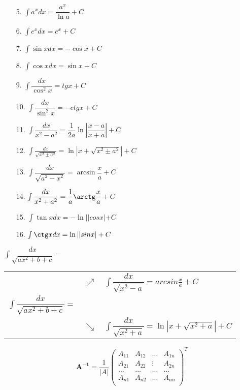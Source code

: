 \documentclass[12pt,4paper]{report}
\begin{document}
\begin{landscape}
\begin{multicols}{3}
\begin{itemize}
\item[5.] $\int a^x dx = \dfrac{a^x}{\ln a}+C $
\item[6.] $ \int e^x dx = e^x + C  $
\item[7.] $\int \sin x dx  = -\cos x + C $
\item[8.] $\int \cos x dx  = \sin x + C $
\item[9.] $ \int \dfrac{dx}{\cos^2x} = tgx + C $
\item[10.] $ \int \dfrac{dx}{\sin^2x} = -ctgx + C $
\item[11.] $\int \dfrac{dx}{x^2 - a^2} = \dfrac{1}{2a}\ln \left| \dfrac{x-a}{x+a} \right| + C\ $ 
\item[12.] $ \int \frac{dx}{\sqrt{x^2 \pm a^2}}=\ln|x+\sqrt{x^2 \pm a^2}| + C$
\item[13.] $\int \dfrac{dx}{\sqrt{a^2 - x^2}} = \arcsin \dfrac{x}{a} + C   $
\item[14.] $ \int \dfrac{dx}{x^2 + a^2} = \dfrac{1}{a} \arctg \dfrac{x}{a} + C$
\item[15.] $ \int \tan x dx  = -\ln||cosx| + C $ 
\item[16.] $ \int \ctg x dx  = \ln||sinx| + C $ 
\end{itemize}
\end{multicols}
 $ \int \dfrac{dx}{\sqrt{ax^2 + b + c}} = $
 \begin{flushright}
   \begin{tabular}{l l l} 
   &  {$\nearrow $} & {$ \int \dfrac{dx}{\sqrt{x^2-a}}=arcsin\frac{x}{a} + C $} \\
  $ \int \dfrac{dx}{\sqrt{ax^2 + b + c}} = $ &  &  \\ 
       & $\searrow $ & $ \int \dfrac{dx}{\sqrt{x^2+a}} = \ln|x+\sqrt{x^2+a}| + C  $\\ 
  \end{tabular}
\end{flushright}
\end{landscape}


\begin{displaymath}
\mathbf{A^{-1}}=\dfrac{1}{|A|}
\left( \begin{array}{cccc}
A_{11} & A_{12} & \ldots & A_{1n} \\
A_{21} & A_{22} & \vdots & A_{2n} \\
\ldots & \ldots & \ldots & \ldots \\
A_{n1} & A_{n2} & \ldots & A_{nn} \\
\end{array} \right)^T
\end{displaymath}
\end{document}
